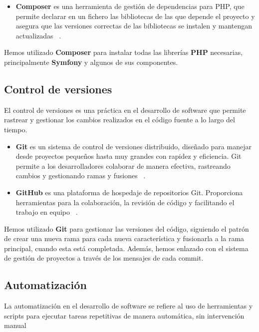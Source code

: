 \begin{itemize}
    \item \textbf{Composer}
    es una herramienta de gestión de dependencias para PHP, que permite declarar en un fichero las bibliotecas de las
    que depende el proyecto y asegura que las versiones correctas de las bibliotecas se instalen y mantengan
    actualizadas ~\cite{https://getcomposer.org/doc/}.
\end{itemize}

Hemos utilizado  \textbf{Composer} para instalar todas las librerías  \textbf{PHP} necesarias, principalmente
\textbf{Symfony} y algunos de sus componentes.

\subsection*{Control de versiones}

El control de versiones es una práctica en el desarrollo de software que permite rastrear y gestionar los cambios
realizados en el código fuente a lo largo del tiempo.

\begin{itemize}
    \item \textbf{Git}
    es un sistema de control de versiones distribuido, diseñado para manejar desde proyectos pequeños hasta muy grandes
    con rapidez y eficiencia.
    Git permite a los desarrolladores colaborar de manera efectiva, rastreando cambios y gestionando ramas y fusiones
    ~\cite{https://git-scm.com/doc}.
    \item \textbf{GitHub} es una plataforma de hospedaje de repositorios Git.
    Proporciona herramientas para la colaboración, la revisión de código y facilitando el trabajo en equipo
    ~\cite{https://docs.github.com/}.
\end{itemize}

Hemos utilizado \textbf{Git} para gestionar las versiones del código, siguiendo el patrón de crear una nueva rama para
cada nueva característica y fusionarla a la rama principal, cuando esta está completada.
Además, hemos enlazado con el sistema de gestión de proyectos a través de los mensajes de cada commit.

\subsection*{Automatización}

La automatización en el desarrollo de software se refiere al uso de herramientas y scripts para ejecutar tareas
repetitivas de manera automática, sin intervención manual

